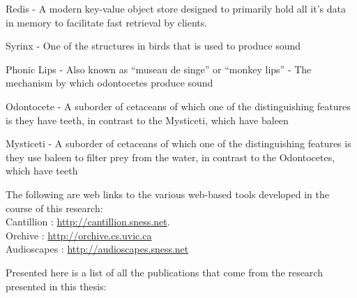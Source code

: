 \documentclass[12pt,oneside]{book}
\begin{document}
Redis - A modern key-value object store designed to primarily hold all
it's data in memory to facilitate fast retrieval by clients.  

Syrinx - One of the structures in birds that is used to produce sound

Phonic Lips - Also known as ``museau de singe'' or ``monkey lips'' -
The mechanism by which odontocetes produce sound

Odontocete - A suborder of cetaceans of which one of the
distinguishing features is they have teeth, in contrast to the
Mysticeti, which have baleen

Mysticeti - A suborder of cetaceans of which one of the distinguishing
features is they use baleen to filter prey from the water, in contrast
to the Odontocetes, which have teeth


\label{chapter:weblinks}

The following are web links to the various web-based tools developed
in the course of this research:
\\

Cantillion : \url{http://cantillion.sness.net}.
\\

Orchive : \url{http://orchive.cs.uvic.ca}
\\

Audioscapes : \url{http://audioscapes.sness.net}
\\



\label{chapter:publications}

Presented here is a list of all the publications that come from the
research presented in this thesis:
\\
\end{document}
